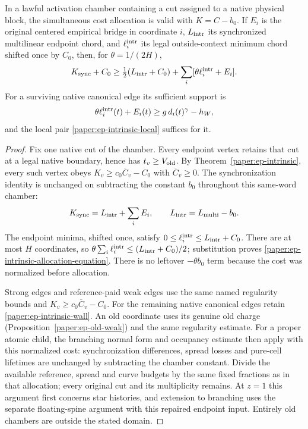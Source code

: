 \begin{proposition}
\label{paper:ep-intrinsic-allocation}
In a lawful activation chamber containing a cut assigned to a native
physical block, the simultaneous cost allocation is valid with
$K=C-b_0$.  If $E_i$ is the original centered empirical bridge in
coordinate $i$, $L_{\rm intr}$ its synchronized multilinear endpoint
chord, and $\ell_i^{\rm intr}$ its legal outside-context minimum chord
shifted once by $C_0$, then, for $\theta=1/(2H)$,
\begin{equation}\label{paper:ep-intrinsic-allocation-equation}
 K_{\rm sync}+C_0
 \geq\tfrac12(L_{\rm intr}+C_0)
             +\sum_i[\theta\ell_i^{\rm intr}+E_i].
\end{equation}
For a surviving native canonical edge its sufficient support is
\begin{equation}\label{paper:ep-intrinsic-wall}
 \theta\ell_i^{\rm intr}(t)+E_i(t)
                           \geq g\,d_i(t)^\gamma-h_W,
\end{equation}
and the local pair \eqref{paper:ep-intrinsic-local} suffices for it.
\end{proposition}
\begin{proof}
Fix one native cut of the chamber.  Every endpoint vertex retains that
cut at a legal native boundary, hence has $t_v\geq V_{\rm old}$.
By Theorem~\ref{paper:ep-intrinsic}, every such vertex obeys
$K_v\geq c_0\overline C_v-C_0$ with $\overline C_v\geq0$.
The synchronization identity is unchanged on subtracting the constant
$b_0$ throughout this same-word chamber:
\[
 K_{\rm sync}=L_{\rm intr}+\sum_iE_i,
 \qquad L_{\rm intr}=L_{\rm multi}-b_0.
\]
The endpoint minima, shifted once, satisfy
$0\leq\ell_i^{\rm intr}\leq L_{\rm intr}+C_0$.
There are at most $H$ coordinates, so
$\theta\sum_i\ell_i^{\rm intr}\leq(L_{\rm intr}+C_0)/2$;
substitution proves \eqref{paper:ep-intrinsic-allocation-equation}.
There is no leftover $-\theta b_0$ term because the cost was normalized
before allocation.

Strong edges and reference-paid weak edges use the same named
regularity bounds and $K_v\geq c_0\overline C_v-C_0$.
For the remaining native canonical edges retain
\eqref{paper:ep-intrinsic-wall}.  An old coordinate uses its genuine
old charge (Proposition~\ref{paper:ep-old-weak}) and the same
regularity estimate.  For a proper atomic child, the branching
normal form and occupancy estimate then apply with this normalized
cost: synchronization differences, spread losses and pure-cell
lifetimes are unchanged by subtracting the chamber constant.
Divide the available reference, spread and curve budgets by the same
fixed fractions as in that allocation; every original cut and its
multiplicity remains.  At $z=1$ this argument first concerns star
histories, and extension to branching uses the separate floating-spine
argument with this repaired endpoint input.  Entirely old chambers
are outside the stated domain.
\end{proof}

